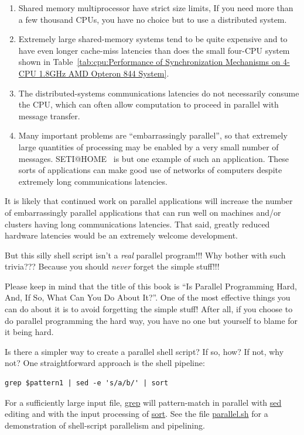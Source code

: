 	\begin{enumerate}
	\item	Shared memory multiprocessor have strict size limits,
		If you need more than a few thousand CPUs, you have no
		choice but to use a distributed system.
	\item	Extremely large shared-memory systems tend to be
		quite expensive and to have even longer cache-miss
		latencies than does the small four-CPU system
		shown in
		Table~\ref{tab:cpu:Performance of Synchronization Mechanisms on 4-CPU 1.8GHz AMD Opteron 844 System}.
	\item	The distributed-systems communications latencies do
		not necessarily consume the CPU, which can often allow
		computation to proceed in parallel with message transfer.
	\item	Many important problems are ``embarrassingly parallel'',
		so that extremely large quantities of processing may
		be enabled by a very small number of messages.
		SETI@HOME~\cite{SETIatHOME2008}
		is but one example of such an application.
		These sorts of applications can make good use of networks
		of computers despite extremely long communications
		latencies.
	\end{enumerate}

	It is likely that continued work on parallel applications will
	increase the number of embarrassingly parallel applications that
	can run well on machines and/or clusters having long communications
	latencies.
	That said, greatly reduced hardware latencies would be an
	extremely welcome development.

\QuickQ{}
	But this silly shell script isn't a \emph{real} parallel program!!!
	Why bother with such trivia???
\QuickA{}
	Because you should \emph{never} forget the simple stuff!!!

	Please keep in mind that the title of this book is
	``Is Parallel Programming Hard, And, If So, What Can You Do About It?''.
	One of the most effective things you can do about it is to
	avoid forgetting the simple stuff!
	After all, if you choose to do parallel programming the hard
	way, you have no one but yourself to blame for it being hard.

\QuickQ{}
	Is there a simpler way to create a parallel shell script?
	If so, how?  If not, why not?
\QuickA{}
	One straightforward approach is the shell pipeline:
\vspace{5pt}
\begin{minipage}[t]{\columnwidth}
\small
\begin{verbatim}
grep $pattern1 | sed -e 's/a/b/' | sort
\end{verbatim}
\end{minipage}
\vspace{5pt}
	For a sufficiently large input file,
	\url{grep} will pattern-match in parallel with \url{sed}
	editing and with the input processing of \url{sort}.
	See the file \url{parallel.sh} for a demonstration of
	shell-script parallelism and pipelining.

